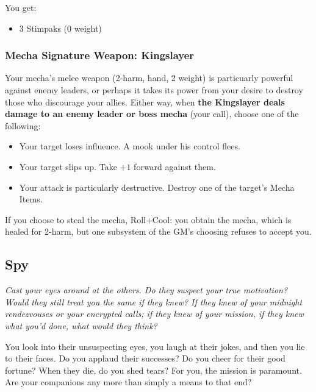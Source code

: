 You get:
\begin{itemize}
\item 3 Stimpaks (0 weight)
\end{itemize}

\subsubsection{Mecha Signature Weapon: Kingslayer}
Your mecha's melee weapon (2-harm, hand, 2 weight) is particuarly powerful against enemy leaders, or perhaps it takes its power from your desire to destroy those who discourage your allies. Either way, when \textbf{the Kingslayer deals damage to an enemy leader or boss mecha} (your call), choose one of the following:
\begin{itemize}
\item Your target loses influence. A mook under his control flees.
\item Your target slips up. Take $+1$ forward against them.
\item Your attack is particularly destructive. Destroy one of the target's Mecha Items.
\end{itemize}


If you choose to steal the mecha, Roll+Cool:
{you obtain the mecha, which is healed for 2-harm, but one subsystem of the GM's choosing refuses to accept you.}



\subsection{Spy}

{\itshape Cast your eyes around at the others. Do they suspect your
  true motivation? Would they still treat you the same if they knew?
  If they knew of your midnight rendezvouses or your encrypted calls;
  if they knew of your mission, if they knew what you'd done, what
  would they think?

You look into their unsuspecting eyes, you laugh at their jokes, and
then you lie to their faces. Do you applaud their successes? Do you
cheer for their good fortune? When they die, do you shed tears? For
you, the mission is paramount. Are your companions any more than
simply a means to that end?}

